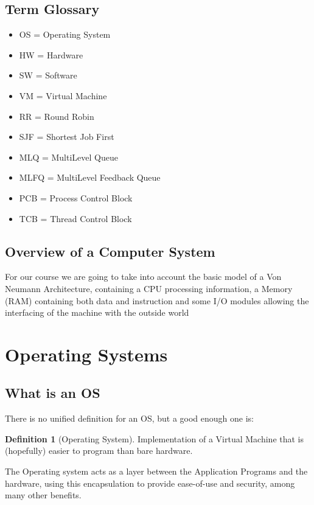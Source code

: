 \documentclass[openright, twoside]{report}
\theoremstyle{definition}
\newtheorem{definition}{Definition}[section]
\theoremstyle{example}
\begin{document}
	\subsection{Term Glossary}
	\begin{itemize}
		\item OS = Operating System
		\item HW = Hardware
		\item SW = Software
		\item VM = Virtual Machine
		\item RR = Round Robin
		\item SJF = Shortest Job First 
		\item MLQ = MultiLevel Queue 
		\item MLFQ = MultiLevel Feedback Queue
		\item PCB = Process Control Block 
		\item TCB = Thread Control Block
	\end{itemize}


	\subsection{Overview of a Computer System}

	For our course we are going to take into account the basic
	model of a Von Neumann Architecture, containing a CPU processing
	information, a Memory (RAM) containing both data and instruction
	and some I/O modules allowing the interfacing of the machine with the outside world


	\section{Operating Systems}\label{sec:OS}
	\subsection{What is an OS}
	There is no unified definition for an OS, but a good enough one is:

	\begin{definition}[Operating System]

		Implementation of a Virtual Machine that is (hopefully)
		easier to program than bare hardware.

	\end{definition}

	The Operating system acts as a layer between the Application
	Programs and the hardware, using this encapsulation to
	provide ease-of-use and security, among many other benefits.
\end{document}
